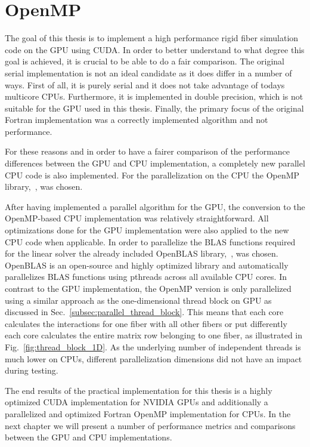 \section{OpenMP}

The goal of this thesis is to implement a high performance rigid fiber simulation code on the GPU using CUDA. In order to better understand to what degree this goal is achieved, it is crucial to be able to do a fair comparison. The original serial implementation is not an ideal candidate as it does differ in a number of ways. First of all, it is purely serial and it does not take advantage of todays multicore CPUs. Furthermore, it is implemented in double precision, which is not suitable for the GPU used in this thesis. Finally, the primary focus of the original Fortran implementation was a correctly implemented algorithm and not performance.

For these reasons and in order to have a fairer comparison of the performance differences between the GPU and CPU implementation, a completely new parallel CPU code is also implemented. For the parallelization on the CPU the OpenMP library,~\cite{OpenMP}, was chosen.

After having implemented a parallel algorithm for the GPU, the conversion to the OpenMP-based CPU implementation was relatively straightforward. All optimizations done for the GPU implementation were also applied to the new CPU code when applicable. In order to parallelize the BLAS functions required for the linear solver the already included OpenBLAS library,~\cite{OpenBLAS}, was chosen. OpenBLAS is an open-source and highly optimized library and automatically parallelizes BLAS functions using pthreads across all available CPU cores. In contrast to the GPU implementation, the OpenMP version is only parallelized using a similar approach as the one-dimensional thread block on GPU as discussed in Sec.~\ref{subsec:parallel_thread_block}. This means that each core calculates the interactions for one fiber with all other fibers or put differently each core calculates the entire matrix row belonging to one fiber, as illustrated in Fig.~\ref{fig:thread_block_1D}. As the underlying number of independent threads is much lower on CPUs, different parallelization dimensions did not have an impact during testing.

The end results of the practical implementation for this thesis is a highly optimized CUDA implementation for NVIDIA GPUs and additionally a parallelized and optimized Fortran OpenMP implementation for CPUs. In the next chapter we will present a number of performance metrics and comparisons between the GPU and CPU implementations.
